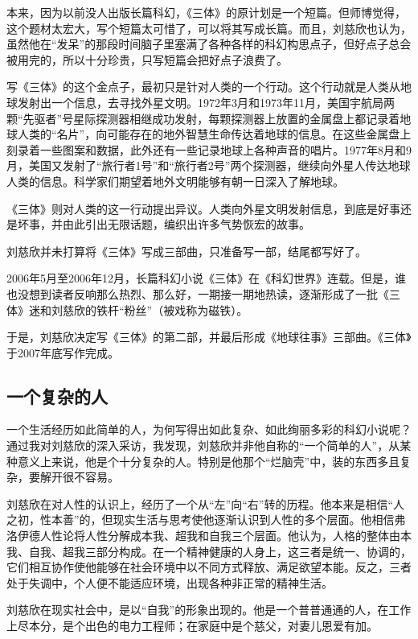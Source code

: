 \documentclass[fontset=fandol,12pt,a5paper]{ctexbook}
\begin{document}
本来，因为以前没人出版长篇科幻，《三体》的原计划是一个短篇。但师博觉得，这个题材太宏大，写个短篇太可惜了，可以将其写成长篇。而且，刘慈欣也认为，虽然他在“发呆”的那段时间脑子里塞满了各种各样的科幻构思点子，但好点子总会被用完的，所以十分珍贵，只写短篇会把好点子浪费了。

写《三体》的这个金点子，最初只是针对人类的一个行动。这个行动就是人类从地球发射出一个信息，去寻找外星文明。1972年3月和1973年11月，美国宇航局两颗“先驱者”号星际探测器相继成功发射，每颗探测器上放置的金属盘上都记录着地球人类的“名片”，向可能存在的地外智慧生命传达着地球的信息。在这些金属盘上刻录着一些图案和数据，此外还有一些记录地球上各种声音的唱片。1977年8月和9月，美国又发射了“旅行者1号”和“旅行者2号”两个探测器，继续向外星人传达地球人类的信息。科学家们期望着地外文明能够有朝一日深入了解地球。

《三体》则对人类的这一行动提出异议。人类向外星文明发射信息，到底是好事还是坏事，并由此引出无限话题，编织出许多气势恢宏的故事。

刘慈欣并未打算将《三体》写成三部曲，只准备写一部，结尾都写好了。

2006年5月至2006年12月，长篇科幻小说《三体》在《科幻世界》连载。但是，谁也没想到读者反响那么热烈、那么好，一期接一期地热读，逐渐形成了一批《三体》迷和刘慈欣的铁杆“粉丝”（被戏称为磁铁）。

于是，刘慈欣决定写《三体》的第二部，并最后形成《地球往事》三部曲。《三体》于2007年底写作完成。

\subsection{一个复杂的人}

一个生活经历如此简单的人，为何写得出如此复杂、如此绚丽多彩的科幻小说呢？通过我对刘慈欣的深入采访，我发现，刘慈欣并非他自称的“一个简单的人”，从某种意义上来说，他是个十分复杂的人。特别是他那个“烂脑壳”中，装的东西多且复杂，要解开很不容易。

刘慈欣在对人性的认识上，经历了一个从“左”向“右”转的历程。他本来是相信“人之初，性本善”的，但现实生活与思考使他逐渐认识到人性的多个层面。他相信弗洛伊德人性论将人性分解成本我、超我和自我三个层面。他认为，人格的整体由本我、自我、超我三部分构成。在一个精神健康的人身上，这三者是统一、协调的，它们相互协作使他能够在社会环境中以不同方式释放、满足欲望本能。反之，三者处于失调中，个人便不能适应环境，出现各种非正常的精神生活。

刘慈欣在现实社会中，是以“自我”的形象出现的。他是一个普普通通的人，在工作上尽本分，是个出色的电力工程师；在家庭中是个慈父，对妻儿恩爱有加。
\end{document}
